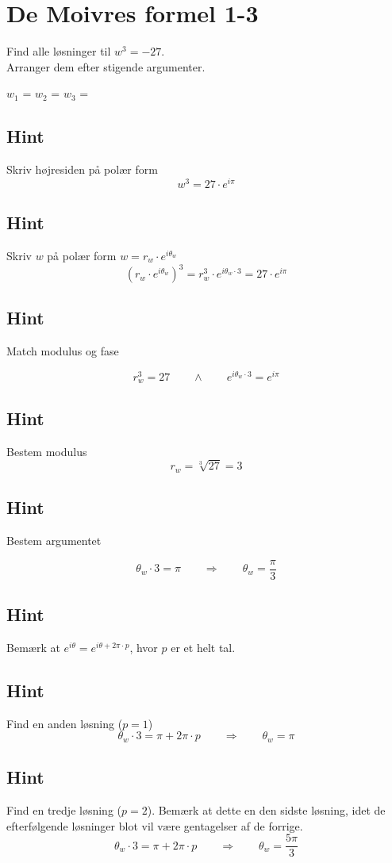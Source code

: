 \documentclass{article}
\newenvironment{exercise}[1]{\newpage\section{#1}}{}
\newcommand{\answerbox}[1]{\fbox{$#1$}}
\newcommand{\hint}{\subsection*{Hint}}
\begin{document}
\begin{exercise}{De Moivres formel 1-3}
	
	Find alle løsninger til $w^3=-27$. \\
	Arranger dem efter stigende argumenter.
	
	$w_1$ = \answerbox{3 \cdot e^{i \frac{\pi}{3}}}		$w_2$ = \answerbox{3 \cdot e^{i \pi}}		$w_3$ = \answerbox{3 \cdot e^{i \frac{5 \pi}{3}}}	
	
	
	\hint 
	
	Skriv højresiden på polær form
	\[
	w^3 = 27 \cdot e^{i \pi}
	\]
	
	
	\hint
	
	Skriv $w$ på polær form $w = r_w \cdot e^{i \theta_w}$
	\[
	\left(r_w \cdot e^{i \theta_w}\right)^3 = r_w^3 \cdot e^{i \theta_w \cdot 3} = 27 \cdot e^{i \pi}
	\]
	
	\hint 
	Match modulus og fase
	
	\[
	r_w^3 = 27 \qquad \wedge \qquad e^{i \theta_w \cdot 3} = e^{i \pi}
	\]
	
	\hint
	
	Bestem modulus
	\[
	r_w  =  \sqrt[3]{27} = 3
	\]
	
	\hint
	
	Bestem argumentet
	
	\[
	\theta_w \cdot 3 = \pi \qquad \Rightarrow \qquad  \theta_w = \frac{\pi}{3}
	\]
	
	\hint
	
	Bemærk at $e^{i \theta} = e^{i \theta + 2 \pi \cdot p}$, hvor $p$ er et helt tal.
	
	\hint
	
	Find en anden løsning ($p=1$)
	\[
	\theta_w \cdot 3 = \pi  + 2 \pi \cdot p \qquad \Rightarrow \qquad  \theta_w = \pi
	\]
	
	\hint
	
	Find en tredje løsning ($p=2$). Bemærk at dette en den sidste løsning, idet de efterfølgende løsninger blot vil være gentagelser af de forrige.
	\[
	\theta_w \cdot 3 = \pi  + 2 \pi \cdot p \qquad \Rightarrow  \qquad  \theta_w = \frac{5 \pi}{3}
	\]
	
	
\end{exercise}

\newpage
\end{document}

